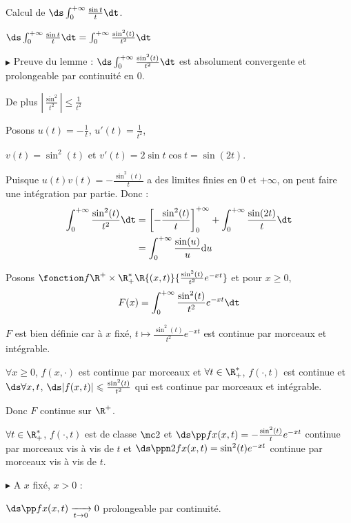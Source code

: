 \begin{exemple}
    Calcul de $\ds \int_{0}^{+ \infty} \frac{\sin t}{t} \dt$.

     $\ds \int_{0}^{+ \infty} \frac{\sin t }{t } \dt = \int_{0}^{+\infty} \frac{\sin^2(t)}{t^2} \dt$

    \avspace $\blacktriangleright$ Preuve du lemme : $\ds \int_{0}^{+\infty} \frac{\sin^2(t)}{t^2} \dt $ est 
    absolument convergente  et prolongeable par continuité en $0$. 
    
    De plus $\left| \frac{\sin^2}{t^2} \right| \leqslant \frac 1 {t^2}$

    Posons $u(t) = - \frac 1 t$, $u'(t) = \frac 1 {t^2}$, 

    $v(t) = \sin^2(t)$ et $v'(t) = 2 \sin t \cos t = \sin(2t)$.

    Puisque $u(t)v(t) = - \frac{\sin^2(t)}{t}$ a des limites finies en $0$ et $+\infty$, on peut faire une intégration par partie. Donc : 
    \begin{align}
        \int_0^{+ \infty} \frac{\sin^2(t)}{t^2} \dt & = \left[ -\frac{\sin^2(t)}{t} \right]_0^{+ \infty} + \int_0^{+ \infty} \frac{\sin(2t)}{t} \dt \\
        & = \int_0^{+ \infty} \frac{\sin(u)}{u} \mathrm d u
    \end{align}

    Posons $\fonction f {\R^+ \times \R^*_+} \R {(x, t)}{\frac{\sin^2(t)}{t^2}e^{-xt}}$ et pour $x \geqslant 0$, 
    $$F(x) = \int_0^{+ \infty} \frac{\sin^2(t)}{t^2} e^{-xt} \dt$$

    $F$ est bien définie car à $x$ fixé, $t \mapsto \frac{\sin^2(t)}{t^2} e^{-xt}$ est continue par morceaux et intégrable.

    $\forall x \geqslant 0$, $f(x, \cdot)$ est continue par morceaux et $\forall t \in \R_+^*$, $f(\cdot, t)$ est continue et 
    $\ds \forall x, t$, $\ds |f(x, t)| \leqslant \frac{\sin^2(t)}{t^2}$ qui est continue par morceaux et intégrable. 

    Donc $F$ continue sur $\R^+$. 

    $\forall t \in \R^*_+$, $f(\cdot, t)$ est de classe $\mc 2$ et 
    $\ds \pp f x (x, t) = - \frac{\sin^2(t)}{t}e^{-xt}$ continue par morceaux vis à vis de $t$ et 
    $\ds \ppn 2 f x(x, t) = \sin^2(t) e^{-xt}$ continue par morceaux vis à vis de $t$.

    \avspace $\blacktriangleright$ A $x$ fixé, $x > 0$ : 

    $\ds \pp f x (x, t) \xrightarrow[t \to 0 ]{} 0$ prolongeable par continuité. 


\end{exemple}
